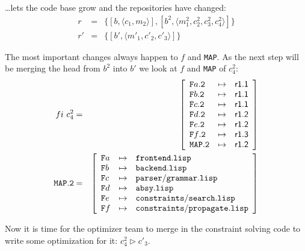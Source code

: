 \documentclass[fleqn, 10pt, a4paper]{article}
\begin{document}
\ldots lets the code base grow and the repositories have changed:
\begin{eqnarray*}
r &=& \{[b, \langle c_1, m_2\rangle], [b^2, \langle m_1^2, c_2^2,
c_3^2, c_4^2\rangle]\} \\
r' &=& \{[b', \langle m'_1, c'_2, c'_3\rangle]\}
\end{eqnarray*}

The most important changes always happen to $f$ and \texttt{MAP}.
As the next step will be merging the head from $b^2$ into $b'$
we look at $f$ and \texttt{MAP} of $c_4^2$:
\begin{eqnarray*}
\mathnormal{fi}\ c_4^2 &=& \left[
\begin{array}{lcl}
\mathtt{F}a\mathtt{.2} & \mapsto & \mathsf{r1.1} \\
\mathtt{F}b\mathtt{.2} & \mapsto & \mathsf{r1.1} \\
\mathtt{F}c\mathtt{.2} & \mapsto & \mathsf{r1.1} \\
\mathtt{F}d\mathtt{.2} & \mapsto & \mathsf{r1.2} \\
\mathtt{F}e\mathtt{.2} & \mapsto & \mathsf{r1.2} \\
\mathtt{F}f\mathtt{.2} & \mapsto & \mathsf{r1.3} \\
\mathtt{MAP.2}         & \mapsto & \mathsf{r1.2} \\
\end{array}\right] \\
\mathtt{MAP.2} &=& \left[
\begin{array}{lcl}
\mathtt{F}a &\mapsto& \mathtt{frontend.lisp} \\
\mathtt{F}b &\mapsto& \mathtt{backend.lisp} \\
\mathtt{F}c &\mapsto& \mathtt{parser/grammar.lisp} \\
\mathtt{F}d &\mapsto& \mathtt{absy.lisp} \\
\mathtt{F}e &\mapsto& \mathtt{constraints/search.lisp} \\
\mathtt{F}f &\mapsto& \mathtt{constraints/propagate.lisp} \\
\end{array}\right]
\end{eqnarray*}

Now it is time for the optimizer team to merge in the constraint solving
code to write some optimization for it: $c_4^2 \rhd c'_3$.
\end{document}
